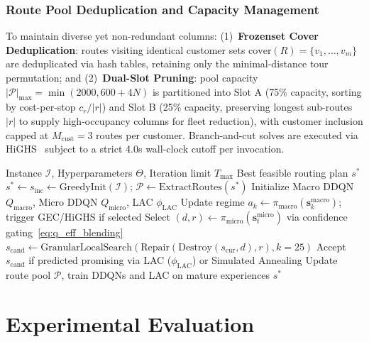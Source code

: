 \documentclass{ieeeaccess}
\begin{document}
\subsubsection{Route Pool Deduplication and Capacity Management}
To maintain diverse yet non-redundant columns: (1)~\textbf{Frozenset Cover Deduplication}: routes visiting identical customer sets $\text{cover}(R) = \{v_1, \dots, v_m\}$ are deduplicated via hash tables, retaining only the minimal-distance tour permutation; and (2)~\textbf{Dual-Slot Pruning}: pool capacity $|\mathcal{P}|_{\max} = \min(2000, 600 + 4N)$ is partitioned into Slot A (75\% capacity, sorting by cost-per-stop $c_r / |r|$) and Slot B (25\% capacity, preserving longest sub-routes $|r|$ to supply high-occupancy columns for fleet reduction), with customer inclusion capped at $M_{\text{cust}} = 3$ routes per customer.
Branch-and-cut solves are executed via HiGHS~\cite{huangfu2018parallelizing} subject to a strict 4.0s wall-clock cutoff per invocation.

\begin{algorithm}[!t]
\caption{Tri-Level Hybrid DDQN-ALNS Overview}
\label{alg:hybrid_ddqn_alns}
\footnotesize
\begin{algorithmic}[1]
\Require Instance $\mathcal{I}$, Hyperparameters $\Theta$, Iteration limit $T_{\max}$
\Ensure Best feasible routing plan $s^*$
\State $s^* \leftarrow s_{\text{inc}} \leftarrow \text{GreedyInit}(\mathcal{I})$; $\mathcal{P} \leftarrow \text{ExtractRoutes}(s^*)$
\State Initialize Macro DDQN $Q_{\text{macro}}$, Micro DDQN $Q_{\text{micro}}$, LAC $\phi_{\text{LAC}}$
     
        \State Update regime $a_k \leftarrow \pi_{\text{macro}}(\mathbf{s}_k^{\text{macro}})$; trigger GEC/HiGHS if selected
    \EndIf
    \State Select $(d, r) \leftarrow \pi_{\text{micro}}(\mathbf{s}_t^{\text{micro}})$ via confidence gating~\eqref{eq:q_eff_blending}
    \State $s_{\text{cand}} \leftarrow \text{GranularLocalSearch}(\text{Repair}(\text{Destroy}(s_{\text{cur}}, d), r), k=25)$
    \State Accept $s_{\text{cand}}$ if predicted promising via LAC ($\phi_{\text{LAC}}$) or Simulated Annealing
    \State Update route pool $\mathcal{P}$, train DDQNs and LAC on mature experiences
\EndFor
\State \Return $s^*$ 
\end{algorithmic}
\end{algorithm}

\section{Experimental Evaluation}
\label{sec:experiments}
\end{document}
